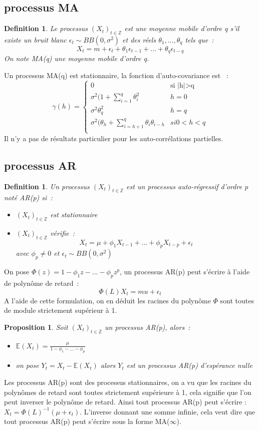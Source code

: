 \documentclass[11pt]{scrartcl} %
\newtheorem{Def}[theorem]{Definition}
\newtheorem{pro}[theorem]{Proposition}
\newcommand{\Xt}{\left(X_t\right)_{t\in\mathbb{Z}}}
\begin{document}
\subsection{processus MA}
\begin{Def}
Le processus $\Xt$ est une moyenne mobile d'ordre q s'il existe un bruit blanc $\epsilon_t\sim BB(0,\sigma^2)$ et des réels $\theta_1,...,\theta_q$ tels que~:~
$$
X_t=m+\epsilon_t+\theta_1\epsilon_{t-1}+...+\theta_q\epsilon_{t-q}
$$ 
On note MA(q) une moyenne mobile d'ordre q.
\end{Def}
Un processus MA(q) est stationnaire, la fonction d'auto-covariance est ~:
$$
\gamma(h)=\left\{\begin{array}{cc}
0 & \textrm{si |h|>q}\\
\sigma^2(1+\sum_{i=1}^q\theta^2_i & h=0\\
\sigma^2 \theta^2_q & h=q\\
\sigma^2(\theta_h+\sum_{i=h+1}^q\theta_i\theta_{i-h} & si 0<h<q\\
\end{array}
\right.
$$
Il n'y a pas de résultats particulier pour les auto-corrélations partielles.
\subsection{processus AR}
\begin{Def}
Un processus $\Xt$ est un processus auto-régressif d'ordre p noté AR(p) si~:
\begin{itemize}
\item[i)] $\Xt$ est stationnaire
\item[ii)] $\Xt$ vérifie~:
$$
X_t = \mu + \phi_1X_{t-1}+...+\phi_pX_{t-p}+\epsilon_t
$$
avec $\phi_p\not=0$ et $\epsilon_t\sim BB(0,\sigma^2)$
\end{itemize}
\end{Def}
On pose $\Phi(z)=1-\phi_1z-...-\phi_pz^p$, un processus AR(p) peut s'écrire à l'aide de polynôme de retard~:
$$
\Phi(L)X_t = mu + \epsilon_t
$$
A l'aide de cette formulation, on en déduit les racines du polynôme $\Phi$ sont toutes de module strictement supérieur à 1.
\begin{pro}
Soit $\Xt$ un processus AR(p), alors~:
\begin{itemize}
\item $\mathbb{E}\left(X_t\right) = \frac{\mu}{1-\phi_1-...-\phi_p}$\\
\item on pose $Y_t=X_t-\mathbb{E}\left(X_t\right)$ alors $Y_t$ est un processus AR(p) d'espérance nulle
\end{itemize}
\end{pro}
Les processus AR(p) sont des processus stationnaires, on a vu que les racines du polynômes de retard sont toutes strictement supérieure à 1, cela signifie que l'on peut inverser le polynôme de retard. Ainsi tout processus AR(p) peut s'écrire : $X_t = \Phi(L)^{-1}\left(\mu + \epsilon_t\right)$. L'inverse donnant une somme infinie, cela veut dire que tout processus AR(p) peut s'écrire sous la forme MA($\infty$).
\end{document}
